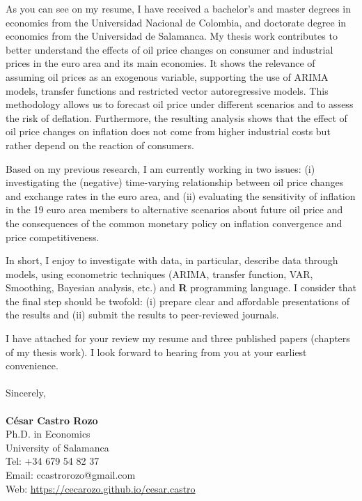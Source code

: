 \documentclass{letter}\usepackage[]{graphicx}\usepackage[]{color}
\begin{document}
{%

As you can see on my resume, I have received a bachelor's and master degrees in economics from the Universidad Nacional de Colombia, and doctorate degree in economics from the Universidad de Salamanca. My thesis work contributes to better understand the effects of oil price changes on consumer and industrial prices in the euro area and its main economies. It shows the relevance of assuming oil prices as an exogenous variable, supporting the use of ARIMA models, transfer functions and restricted vector autoregressive models. This methodology allows us to forecast oil price under different scenarios and to assess the risk of deflation. Furthermore, the resulting analysis shows that the effect of oil price changes on inflation does not come from higher industrial costs but rather depend on the reaction of consumers.

Based on my previous research, I am currently working in two issues: (i) investigating the (negative) time-varying relationship between oil price changes and exchange rates in the euro area, and (ii) evaluating the sensitivity of inflation in the 19 euro area members to alternative scenarios about future oil price and the consequences of the common monetary policy on inflation convergence and price competitiveness.

In short, I enjoy to investigate with data, in particular, describe data through models, using econometric techniques (ARIMA, transfer function, VAR, Smoothing, Bayesian analysis, etc.) and \textbf{\textsf{R}} programming language. I consider that the final step should be twofold: (i) prepare clear and affordable presentations of the results and (ii) submit the results to peer-reviewed journals.

I have attached for your review my resume and three published papers (chapters of my thesis work). I look forward to hearing from you at your earliest convenience.\\
\\
Sincerely,\\
\\
\textbf{César Castro Rozo}\\
Ph.D. in Economics\\
University of Salamanca\\
Tel: +34 679 54 82 37\\
Email: ccastrorozo@gmail.com\\
Web: \href{https://cecarozo.github.io/cesar.castro}{https://cecarozo.github.io/cesar.castro}



}
\end{document}
